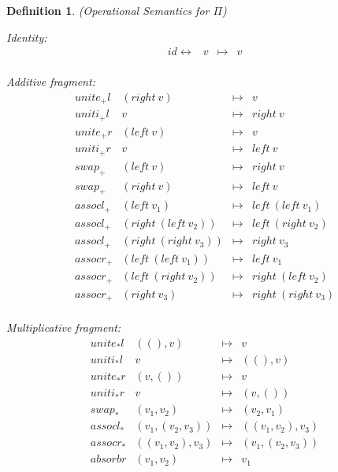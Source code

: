 \documentclass{article}
\newtheorem{definition}[theorem]{Definition}
\newcommand{\identlp}{\ensuremath{\mathit{unite}_+\mathit{l}}}
\newcommand{\identrp}{\ensuremath{\mathit{uniti}_+\mathit{l}}}
\newcommand{\identlsp}{\ensuremath{\mathit{unite}_+\mathit{r}}}
\newcommand{\identrsp}{\ensuremath{\mathit{uniti}_+\mathit{r}}}
\newcommand{\swapp}{\ensuremath{\mathit{swap}_+}}
\newcommand{\assoclp}{\ensuremath{\mathit{assocl}_+}}
\newcommand{\assocrp}{\ensuremath{\mathit{assocr}_+}}
\newcommand{\identlt}{\ensuremath{\mathit{unite}_*\mathit{l}}}
\newcommand{\identrt}{\ensuremath{\mathit{uniti}_*\mathit{l}}}
\newcommand{\identlst}{\ensuremath{\mathit{unite}_*\mathit{r}}}
\newcommand{\identrst}{\ensuremath{\mathit{uniti}_*\mathit{r}}}
\newcommand{\swapt}{\ensuremath{\mathit{swap}_*}}
\newcommand{\assoclt}{\ensuremath{\mathit{assocl}_*}}
\newcommand{\assocrt}{\ensuremath{\mathit{assocr}_*}}
\newcommand{\absorbr}{\ensuremath{\mathit{absorbr}}}
\newcommand{\idc}{\mathit{id}\!\!\leftrightarrow}
\begin{document}
\begin{definition}{(Operational Semantics for \ensuremath{\Pi })}
\label{def:operational-langRev}

Identity:
\[\begin{array}{rlcl}
 \idc & v &\mapsto & v \\
 \end{array}\]

Additive fragment:
\[\begin{array}{rlcl}
 \identlp & (\mathit{right} ~v) &\mapsto & v \\
 \identrp & v &\mapsto & \mathit{right} ~v \\
 \identlsp & (\mathit{left} ~v) &\mapsto & v \\
 \identrsp & v &\mapsto & \mathit{left} ~v \\
 \swapp & (\mathit{left} ~v) &\mapsto & \mathit{right} ~v \\
 \swapp & (\mathit{right} ~v) &\mapsto & \mathit{left} ~v \\
 \assoclp & (\mathit{left} ~v_1) &\mapsto & \mathit{left} ~(\mathit{left} ~v_1) \\
 \assoclp & (\mathit{right} ~(\mathit{left} ~v_2)) &\mapsto & \mathit{left} ~(\mathit{right} ~v_2) \\
 \assoclp & (\mathit{right} ~(\mathit{right} ~v_3)) &\mapsto & \mathit{right} ~v_3 \\
 \assocrp & (\mathit{left} ~(\mathit{left} ~v_1)) &\mapsto & \mathit{left} ~v_1 \\
 \assocrp & (\mathit{left} ~(\mathit{right} ~v_2)) &\mapsto & \mathit{right} ~(\mathit{left} ~v_2) \\
 \assocrp & (\mathit{right} ~v_3) &\mapsto & \mathit{right} ~(\mathit{right} ~v_3) \\
 \end{array}\]

Multiplicative fragment:
\[\begin{array}{rlcl}
 \identlt & ((), v) &\mapsto & v \\
 \identrt & v &\mapsto & ((), v) \\
 \identlst & (v, ()) &\mapsto & v \\
 \identrst & v &\mapsto & (v, ()) \\
 \swapt & (v_1, v_2) &\mapsto & (v_2, v_1) \\
 \assoclt & (v_1, (v_2, v_3)) &\mapsto & ((v_1, v_2), v_3) \\
 \assocrt & ((v_1, v_2), v_3) &\mapsto & (v_1, (v_2, v_3)) \\
 \absorbr & (v_1, v_2) & \mapsto & v_1 \\
 \end{array}\]


\end{definition}
\end{document}
